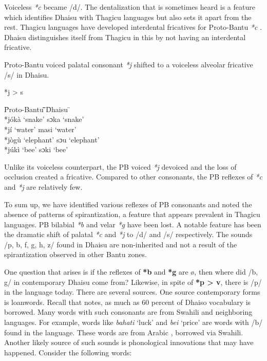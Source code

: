 \documentclass[output=paper,colorlinks,citecolor=brown]{langscibook}
\begin{document}
Voiceless \textit{*c} became /d/. The dentalization that is sometimes heard is a feature which identifies Dhaisu with Thagicu languages but also sets it apart from the rest. Thagicu languages have developed interdental fricatives for Proto-Bantu \textit{*c }\citep{Nurse1982}. Dhaisu distinguishes itself from Thagicu in this by not having an interdental fricative. 

Proto-Bantu voiced palatal consonant \textit{*j}  shifted to a voiceless alveolar fricative /s/ in Dhaisu.

\ea%
    \label{ex:ngonyani:10}
    *j > s\\
	\begin{tabbing} 
        \= Proto-Bantu \quad\= \quad\= \quad\= \quad\= \quad\= \quad\= \quad\= Dhaisu \quad\=  \quad\= \\
        \>  *jókà
        \> ‘snake’
        \> \> \>  \> \> \> sɔka
        \> ‘snake’\\
        
        \> *jí
        \> ‘water’
        \> \> \>  \> \> \> masi
        \> ‘water’\\
        
        \> *jògù
        \> ‘elephant’
        \> \> \>  \> \> \> sɔu
        \> ‘elephant’\\
        
        \> *júkì
        \> ‘bee’
        \> \> \>  \> \> \> sɔki
        \> ‘bee’
    \end{tabbing}
\z

Unlike its voiceless counterpart, the PB voiced \textit{*j} devoiced and the loss of occlusion  created a fricative. Compared to other consonants, the PB reflexes of \textit{*c} and \textit{*j} are relatively few.

To sum up, we have identified various reflexes of PB consonants and noted the absence of patterns of spirantization, a feature that appears prevalent in Thagicu languages. PB bilabial \textit{*b} and velar \textit{*g}  have been lost. A notable feature has been the dramatic shift of palatal \textit{*c }and \textit{*j} to /d/ and /s/ respectively. The sounds /p, b, f, g, h, z/ found in Dhaisu are non-inherited \citep{Nurse2000}  and not a result of the spirantization observed in other Bantu zones. 
     
One question that arises is if the reflexes of \textbf{*b} and \textbf{*g} are ø, then where did /b, g/ in contemporary Dhaisu come from? Likewise, in spite of \textbf{*p > v}, there is /p/ in the language today. There are several sources. One source contemporary forms is loanwords. Recall that \cite[20]{Nurse2000} notes, as much as 60 percent of Dhaiso vocabulary is borrowed. Many words with such consonants are from Swahili and neighboring languages. For example, words like \textit{bahati }‘luck’ and \textit{bei} ‘price’ are words with /b/ found in the language. These words are from Arabic \citep{TUKI1996}, borrowed via Swahili. Another likely source of such sounds is phonological innovations that may have happened. Consider the following words:
\end{document}
